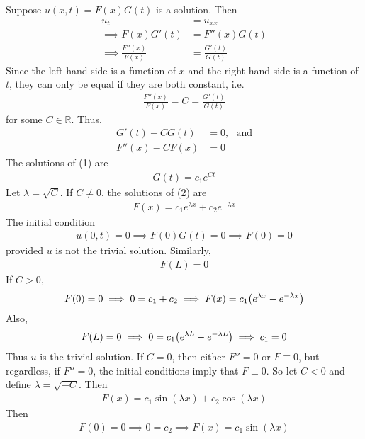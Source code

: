 \documentclass[fontsize=11pt]{article} %
\theoremstyle{plain}
\numberwithin{equation}{section} %
\numberwithin{figure}{section} %
\numberwithin{table}{section} %
\begin{document}
Suppose $u(x,t) = F(x)G(t)$ is a solution.  Then
\begin{align*}
    u_t &= u_{xx} \\
    \implies F(x)G'(t) &= F''(x)G(t) \\
    \implies \frac{F''(x)}{F(x)} &= \frac{G'(t)}{G(t)}
\end{align*}
Since the left hand side is a function of $x$ and the right hand side is a function of $t$, they can only be equal if they are both constant, i.e.
\begin{align*}
    \frac{F''(x)}{F(x)} = C = \frac{G'(t)}{G(t)}
\end{align*}
for some $C \in \mathbb{R}$.  Thus,
\begin{align}
    G'(t) - C G(t) &= 0,\ \ \ \text{and} \\
    F''(x) - C F(x) &= 0
\end{align}
The solutions of (1) are
\begin{align*}
    G(t) = c_1 e^{Ct}
\end{align*}
Let $\lambda = \sqrt{C}$.  If $C \neq 0$, the solutions of (2) are
\begin{align*}
    F(x) = c_1 e^{\lambda x} + c_2 e^{-\lambda x}
\end{align*}
The initial condition
\begin{align*}
    u(0,t) = 0 \implies F(0)G(t) = 0 \implies F(0) = 0
\end{align*}
provided $u$ is not the trivial solution.  Similarly,
\begin{align*}
    F(L) = 0
\end{align*}
If $C > 0$,
\begin{align*}
    F(0) = 0 \implies 0 = c_1 + c_2 \implies F(x) = c_1\qty(e^{\lambda x} - e^{-\lambda x})
\end{align*}
Also,
\begin{align*}
    F(L) = 0 \implies 0 = c_1\qty(e^{\lambda L} - e^{-\lambda L}) \implies c_1 = 0
\end{align*}
Thus $u$ is the trivial solution.  If $C = 0$, then either $F'' = 0$ or $F \equiv 0$, but regardless, if $F'' = 0$, the initial conditions imply that $F \equiv 0$.  So let $C < 0$ and define $\lambda = \sqrt{-C}$.  Then
\begin{align*}
    F(x) = c_1 \sin(\lambda x) + c_2 \cos(\lambda x)
\end{align*}
Then
\begin{align*}
    F(0) = 0 \implies 0 = c_2 \implies F(x) = c_1 \sin(\lambda x)
\end{align*}
\end{document}
